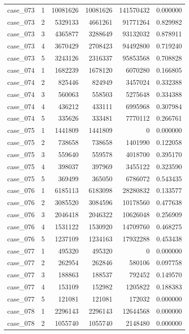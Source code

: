 \begin{longtable}{lrrrrr}
case\_073 & 1 & 10081626 & 10081626 & 141570432 & 0.000000 \\
case\_073 & 2 & 5329133 & 4661261 & 91771264 & 0.829982 \\
case\_073 & 3 & 4365877 & 3288649 & 93132032 & 0.878911 \\
case\_073 & 4 & 3670429 & 2708423 & 94492800 & 0.719240 \\
case\_073 & 5 & 3243126 & 2316337 & 95853568 & 0.708828 \\
case\_074 & 1 & 1682239 & 1678120 & 6070280 & 0.166805 \\
case\_074 & 2 & 825446 & 824949 & 3457024 & 0.332388 \\
case\_074 & 3 & 560063 & 558503 & 5275648 & 0.334388 \\
case\_074 & 4 & 436212 & 433111 & 6995968 & 0.307984 \\
case\_074 & 5 & 335626 & 333481 & 7770112 & 0.266761 \\
case\_075 & 1 & 1441809 & 1441809 & 0 & 0.000000 \\
case\_075 & 2 & 738658 & 738658 & 1401990 & 0.122058 \\
case\_075 & 3 & 559640 & 559578 & 4018700 & 0.395170 \\
case\_075 & 4 & 398037 & 397969 & 3455122 & 0.323590 \\
case\_075 & 5 & 369499 & 365050 & 6786072 & 0.543435 \\
case\_076 & 1 & 6185113 & 6183098 & 28280832 & 0.133577 \\
case\_076 & 2 & 3085520 & 3084596 & 10178560 & 0.477638 \\
case\_076 & 3 & 2046418 & 2046322 & 10626048 & 0.256909 \\
case\_076 & 4 & 1531122 & 1530920 & 14709760 & 0.468275 \\
case\_076 & 5 & 1237109 & 1234163 & 17932288 & 0.453438 \\
case\_077 & 1 & 495320 & 495320 & 0 & 0.000000 \\
case\_077 & 2 & 262954 & 262846 & 580106 & 0.097758 \\
case\_077 & 3 & 188863 & 188537 & 792452 & 0.149570 \\
case\_077 & 4 & 153109 & 152982 & 1205822 & 0.188383 \\
case\_077 & 5 & 121081 & 121081 & 172032 & 0.000000 \\
case\_078 & 1 & 2296143 & 2296143 & 12644568 & 0.000000 \\
case\_078 & 2 & 1055740 & 1055740 & 2148480 & 0.000000 \\

\end{longtable}
